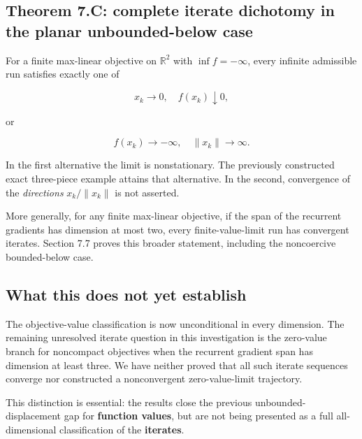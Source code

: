 

\subsection{Theorem 7.C: complete iterate dichotomy in the planar
unbounded-below
case}\label{H:theorem-c-complete-iterate-dichotomy-in-the-planar-unbounded-below-case}

For a finite max-linear objective on \(\mathbb R^2\) with
\(\inf f=-\infty\), every infinite admissible run satisfies exactly one
of

\[
\boxed{x_k\longrightarrow0,\quad f(x_k)\downarrow0,}
\]

or

\[
\boxed{f(x_k)\longrightarrow-\infty,\quad\|x_k\|\longrightarrow\infty.}
\]

In the first alternative the limit is nonstationary. The previously
constructed exact three-piece example attains that alternative. In the
second, convergence of the \emph{directions} \(x_k/\|x_k\|\) is not
asserted.

More generally, for any finite max-linear objective, if the span of the
recurrent gradients has dimension at most two, every finite-value-limit
run has convergent iterates. Section 7.7 proves this broader statement,
including the noncoercive bounded-below case.



\subsection{What this does not yet
establish}\label{H:what-this-does-not-yet-establish}

The objective-value classification is now unconditional in every
dimension. The remaining unresolved iterate question in this
investigation is the zero-value branch for noncompact objectives when
the recurrent gradient span has dimension at least three. We have
neither proved that all such iterate sequences converge nor constructed
a nonconvergent zero-value-limit trajectory.

This distinction is essential: the results close the previous
unbounded-displacement gap for \textbf{function values}, but are not
being presented as a full all-dimensional classification of the
\textbf{iterates}.


\setcounter{section}{1}
\setcounter{theorem}{0}
\setcounter{lemma}{0}
\setcounter{corollary}{0}
\setcounter{proposition}{0}
\setcounter{remark}{0}
\setcounter{equation}{0}


